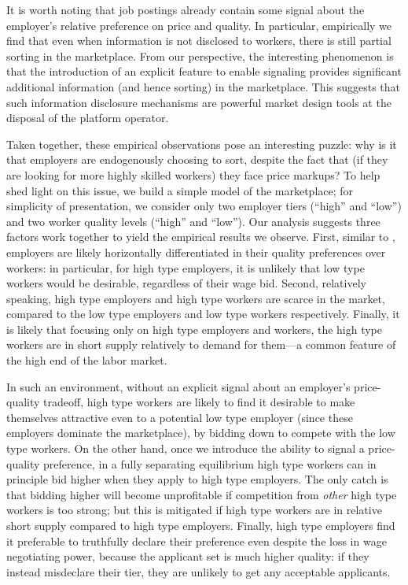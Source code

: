 \documentclass[prodmode,acmec]{ec-acmsmall}
\begin{document}
It is worth noting that job postings already contain some signal about the employer's relative preference on price and quality.  In particular, empirically we find that even when information is not disclosed to workers, there is still partial sorting in the marketplace.  From our perspective, the interesting phenomenon is that the introduction of an explicit feature to enable signaling provides significant additional information (and hence sorting) in the marketplace.
This suggests that such information disclosure mechanisms are powerful market design tools at the disposal of the platform operator.

Taken together, these empirical observations pose an interesting puzzle: why is it that employers are endogenously choosing to sort, despite the fact that (if they are looking for more highly skilled workers) they face price markups?
To help shed light on this issue, we build a simple model of the marketplace; for simplicity of presentation, we consider only two employer tiers (``high'' and ``low'') and two worker quality levels (``high'' and ``low'').
Our analysis suggests three factors work together to yield the empirical results we observe.  First, similar to \cite{tadelis2011information}, employers are likely horizontally differentiated in their quality preferences over workers: in particular, for high type employers, it is unlikely that low type workers would be desirable, regardless of their wage bid.
Second, relatively speaking, high type employers and high type workers are scarce in the market, compared to the low type employers and low type workers respectively.
Finally, it is likely that focusing only on high type employers and workers, the high type workers are in short supply relatively to demand for them---a common feature of the high end of the labor market.

In such an environment, without an explicit signal about an employer's price-quality tradeoff, high type workers are likely to find it desirable to make themselves attractive even to a potential low type employer (since these employers dominate the marketplace), by bidding down to compete with the low type workers.
On the other hand, once we introduce the ability to signal a price-quality preference, in a fully separating equilibrium high type workers can in principle bid higher when they apply to high type employers.
The only catch is that bidding higher will become unprofitable if competition from {\em other} high type workers is too strong;
but this is mitigated if high type workers are in relative short supply compared to high type employers.
Finally, high type employers find it preferable to truthfully declare their preference even despite the loss in wage negotiating power, because the applicant set is much higher quality:
if they instead misdeclare their tier, they are unlikely to get any acceptable applicants.
\end{document}
